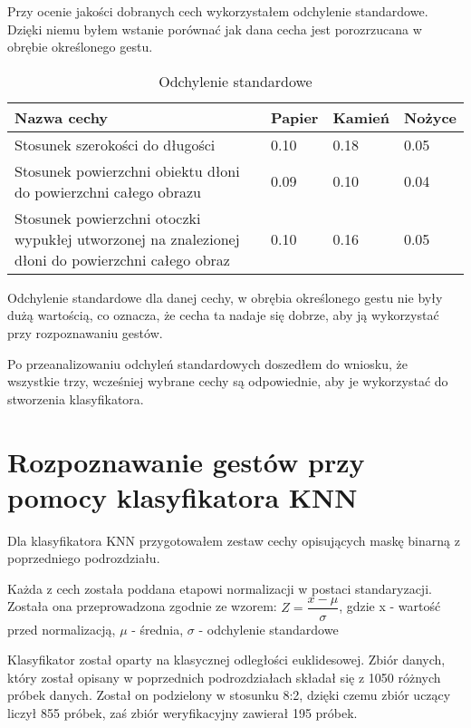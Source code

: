 \documentclass[a4paper,12pt,twoside,openany]{report}
\begin{document}
Przy ocenie jakości dobranych cech wykorzystałem odchylenie standardowe. Dzięki niemu byłem wstanie porównać jak dana cecha jest porozrzucana w obrębie określonego gestu.

\begin{table}[H]
	\centering
	\begin{tabularx}{\textwidth}{|X|l|l|l|}
		\hline
		\textbf{Nazwa cechy} & \textbf{Papier} & \textbf{Kamień} & \textbf{Nożyce} \\ 
		
		\hline
		Stosunek szerokości do długości & 0.10 & 0.18 & 0.05 \\ 
		
		\hline
		Stosunek powierzchni obiektu dłoni do powierzchni całego obrazu & 0.09 & 0.10 & 0.04 \\ 
		
		\hline
		Stosunek powierzchni otoczki wypukłej utworzonej na znalezionej dłoni do powierzchni całego obraz & 0.10 & 0.16 & 0.05 \\ 
		\hline
	\end{tabularx}
	
	\caption{Odchylenie standardowe}
\end{table}
Odchylenie standardowe dla danej cechy, w obrębia określonego gestu nie były dużą wartością, co oznacza, że cecha ta nadaje się dobrze, aby ją wykorzystać przy rozpoznawaniu gestów.

Po przeanalizowaniu odchyleń standardowych doszedłem do wniosku, że wszystkie trzy, wcześniej wybrane cechy są odpowiednie, aby je wykorzystać do stworzenia klasyfikatora.  

\section{Rozpoznawanie gestów przy pomocy klasyfikatora KNN}
Dla klasyfikatora KNN przygotowałem zestaw cechy opisujących maskę binarną z poprzedniego podrozdziału.

Każda z cech została poddana etapowi normalizacji w postaci standaryzacji. Została ona przeprowadzona zgodnie ze wzorem: $ Z = \dfrac{x - \mu}{\sigma} $, gdzie x - wartość przed normalizacją, $\mu$ - średnia, $\sigma$ - odchylenie standardowe

Klasyfikator został oparty na klasycznej odległości euklidesowej. Zbiór danych, który został opisany w poprzednich podrozdziałach składał się z 1050 różnych próbek danych. Został on podzielony w stosunku 8:2, dzięki czemu zbiór uczący liczył 855 próbek, zaś zbiór weryfikacyjny zawierał 195 próbek. 
\end{document}
